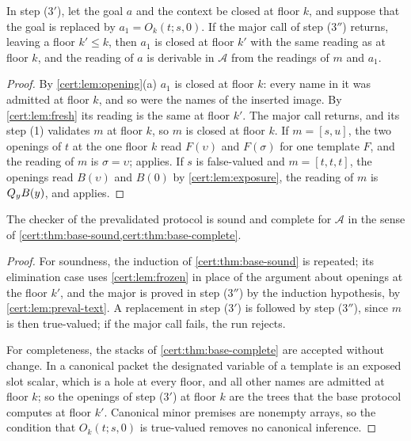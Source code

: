 \begin{lemma}\label{cert:lem:frozen}
In step ($3'$), let the goal $a$ and the context be closed at floor $k$, and
suppose that the goal is replaced by $a_1=O_k(t;s,0)$. If the major call of
step ($3''$) returns, leaving a floor $k'\le k$, then $a_1$ is closed at floor
$k'$ with the same reading as at floor $k$, and the reading of $a$ is
derivable in $\mathcal A$ from the readings of $m$ and $a_1$.
\end{lemma}
\begin{proof}
By \cref{cert:lem:opening}(a) $a_1$ is closed at floor $k$: every name in it
was admitted at floor $k$, and so were the names of the inserted image. By
\cref{cert:lem:fresh} its reading is the same at floor $k'$. The major call
returns, and its step (1) validates $m$ at floor $k$, so $m$ is closed at
floor $k$. If
$m=[s,u]$, the two openings of $t$ at the one floor $k$ read $F(\upsilon)$ and
$F(\sigma)$ for one template $F$, and the reading of $m$ is $\sigma=\upsilon$;
 applies. If $s$ is false-valued and $m=[t,t,t]$, the openings
read $B(\upsilon)$ and $B(0)$ by \cref{cert:lem:exposure}, the reading of $m$
is $Q_{y}B(y)$, and  applies.
\end{proof}

\begin{theorem}\label{cert:thm:preval}
The checker of the prevalidated protocol is sound and complete for
$\mathcal A$ in the sense of \cref{cert:thm:base-sound,cert:thm:base-complete}.
\end{theorem}
\begin{proof}
For soundness, the induction of \cref{cert:thm:base-sound} is repeated; its
elimination case uses \cref{cert:lem:frozen} in place of the argument about
openings at the floor $k'$, and the major is proved in step ($3''$) by the
induction hypothesis, by \cref{cert:lem:preval-text}. A replacement in step
($3'$) is followed by step ($3''$), since $m$ is then true-valued; if the major
call fails, the run rejects.

For completeness, the stacks of \cref{cert:thm:base-complete} are accepted
without change. In a canonical packet the designated variable of a template
is an exposed slot scalar, which is a hole at every floor, and all other
names are admitted at floor $k$; so the openings of step ($3'$) at floor $k$
are the trees that the base protocol computes at floor $k'$. Canonical minor
premises are nonempty arrays, so the condition that $O_k(t;s,0)$ is
true-valued removes no canonical inference.
\end{proof}

